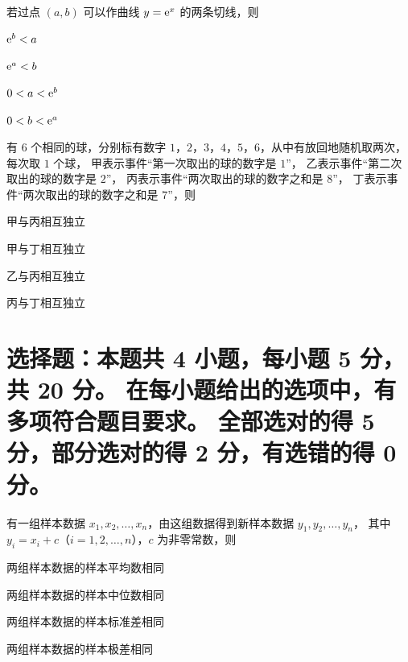 \documentclass{exam-zh}
\begin{document}
\begin{question}
  若过点 $(a, b)$ 可以作曲线 $y = \mathrm{ e }^x$ 的两条切线，则 \paren
  \begin{choices}
    \item $\mathrm{ e }^b < a$
    \item $\mathrm{ e }^a < b$
    \item $0 < a < \mathrm{ e }^b$
    \item $0 < b < \mathrm{ e }^a$
  \end{choices}
\end{question}

\begin{question}
  有 $6$ 个相同的球，分别标有数字 $1$，$2$，$3$，$4$，$5$，$6$，从中有放回地随机取两次，每次取 $1$ 个球，
  甲表示事件“第一次取出的球的数字是 $1$”，
  乙表示事件“第二次取出的球的数字是 $2$”，
  丙表示事件“两次取出的球的数字之和是 $8$”，
  丁表示事件“两次取出的球的数字之和是 $7$”，则 \paren
  \begin{choices}
    \item 甲与丙相互独立
    \item 甲与丁相互独立
    \item 乙与丙相互独立
    \item 丙与丁相互独立
  \end{choices}
\end{question}



\section{%
  选择题：本题共 4 小题，每小题 5 分，共 20 分。
  在每小题给出的选项中，有多项符合题目要求。
  全部选对的得 5 分，部分选对的得 2 分，有选错的得 0 分。
}

\begin{question}
  有一组样本数据 $x_1, x_2, \dots, x_n$，由这组数据得到新样本数据 $y_1, y_2, \dots, y_n$，
  其中 $y_i = x_i + c$（$i = 1, 2, \dots, n$），$c$ 为非零常数，则 \paren
  \begin{choices}
    \item 两组样本数据的样本平均数相同
    \item 两组样本数据的样本中位数相同
    \item 两组样本数据的样本标准差相同
    \item 两组样本数据的样本极差相同
  \end{choices}
\end{question}
\end{document}
